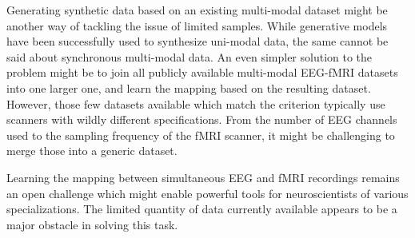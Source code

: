 \documentclass{article}
\begin{document}
Generating synthetic data based on an existing multi-modal dataset might be another way of tackling the issue of limited samples. While generative models have been successfully used to synthesize uni-modal data, the same cannot be said about synchronous multi-modal data. An even simpler solution to the problem might be to join all publicly available multi-modal EEG-fMRI datasets into one larger one, and learn the mapping based on the resulting dataset. However, those few datasets available which match the criterion typically use scanners with wildly different specifications. From the number of EEG channels used to the sampling frequency of the fMRI scanner, it might be challenging to merge those into a generic dataset.

Learning the mapping between simultaneous EEG and fMRI recordings remains an open challenge which might enable powerful tools for neuroscientists of various specializations. The limited quantity of data currently available appears to be a major obstacle in solving this task.



\end{document}
